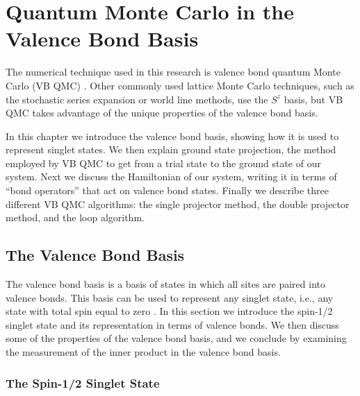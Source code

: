 
\chapter{Quantum Monte Carlo in the Valence Bond Basis}
The numerical technique used in this research is valence bond quantum Monte Carlo (VB QMC) \cite{Sandvik_vbqmc,Sandvik2007}.
Other commonly used lattice Monte Carlo techniques, such as the stochastic series expansion\cite{Sylji2002} or world line \cite{Evertz2003} methods, use the $S^z$ basis, but VB QMC takes advantage of the unique properties of the valence bond basis.  

In this chapter we introduce the valence bond basis, showing how it is used to represent singlet states.  
We then explain ground state projection, the method employed by VB QMC to get from a trial state to the ground state of our system.
Next we discuss the Hamiltonian of our system, writing it in terms of ``bond operators'' that act on valence bond states.
Finally we describe three different VB QMC algorithms: the single projector method, the double projector method, and the loop algorithm.

\section{The Valence Bond Basis} \label{sec:basis}
The valence bond basis is a basis of states in which all sites are paired into valence bonds.  
This basis can be used to represent any singlet state, i.e., any state with total spin equal to zero \cite{Anderson1973, Anderson1974}.
In this section we introduce the spin-1/2 singlet state and its representation in terms of valence bonds.
We then discuss some of the properties of the valence bond basis,
and we conclude by examining the measurement of the inner product in the valence bond basis.
\subsection{The Spin-1/2 Singlet State}

